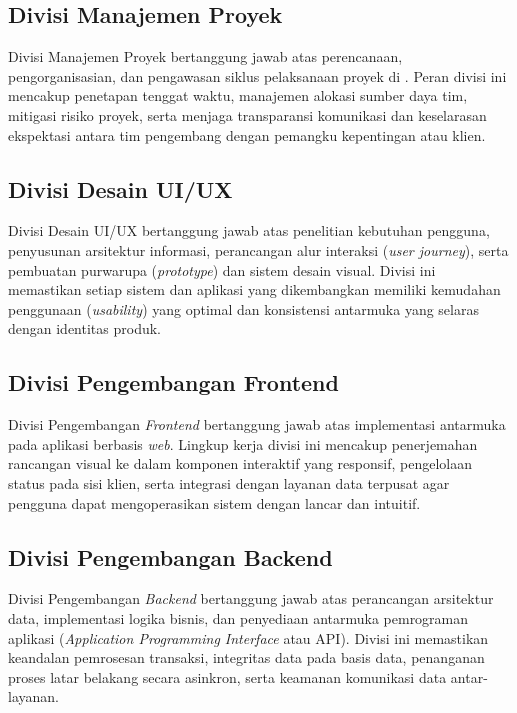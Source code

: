\subsection{Divisi Manajemen Proyek}

Divisi Manajemen Proyek bertanggung jawab atas perencanaan, pengorganisasian, dan pengawasan siklus pelaksanaan proyek di \NamaPerusahaan. Peran divisi ini mencakup penetapan tenggat waktu, manajemen alokasi sumber daya tim, mitigasi risiko proyek, serta menjaga transparansi komunikasi dan keselarasan ekspektasi antara tim pengembang dengan pemangku kepentingan atau klien.

\subsection{Divisi Desain UI/UX}

Divisi Desain UI/UX bertanggung jawab atas penelitian kebutuhan pengguna, penyusunan arsitektur informasi, perancangan alur interaksi (\textit{user journey}), serta pembuatan purwarupa (\textit{prototype}) dan sistem desain visual. Divisi ini memastikan setiap sistem dan aplikasi yang dikembangkan memiliki kemudahan penggunaan (\textit{usability}) yang optimal dan konsistensi antarmuka yang selaras dengan identitas produk.

\subsection{Divisi Pengembangan Frontend}

Divisi Pengembangan \textit{Frontend} bertanggung jawab atas implementasi antarmuka pada aplikasi berbasis \textit{web}. Lingkup kerja divisi ini mencakup penerjemahan rancangan visual ke dalam komponen interaktif yang responsif, pengelolaan status pada sisi klien, serta integrasi dengan layanan data terpusat agar pengguna dapat mengoperasikan sistem dengan lancar dan intuitif.

\subsection{Divisi Pengembangan Backend}

Divisi Pengembangan \textit{Backend} bertanggung jawab atas perancangan arsitektur data, implementasi logika bisnis, dan penyediaan antarmuka pemrograman aplikasi (\textit{Application Programming Interface} atau API). Divisi ini memastikan keandalan pemrosesan transaksi, integritas data pada basis data, penanganan proses latar belakang secara asinkron, serta keamanan komunikasi data antar-layanan.

